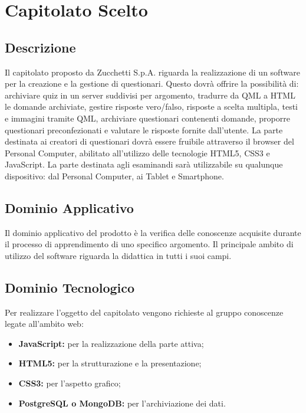 \section{Capitolato Scelto}
\subsection{Descrizione}
Il capitolato proposto da Zucchetti S.p.A. riguarda la realizzazione di un software per la creazione e la gestione di questionari. 
Questo dovrà offrire la possibilità di: archiviare quiz in un server suddivisi per argomento, tradurre da QML a HTML le domande archiviate, gestire risposte vero/falso, risposte a scelta multipla, testi e immagini tramite QML, archiviare questionari contenenti domande, proporre questionari preconfezionati e valutare le risposte fornite dall’utente.
La parte destinata ai creatori di questionari dovrà essere fruibile attraverso il browser del Personal Computer, abilitato all’utilizzo delle tecnologie HTML5, CSS3 e JavaScript.
La parte destinata agli esaminandi sarà utilizzabile su qualunque dispositivo: dal Personal Computer, ai Tablet e Smartphone.

\subsection{Dominio Applicativo}
Il dominio applicativo del prodotto è la verifica delle conoscenze acquisite durante il processo di apprendimento di uno specifico argomento.
Il principale ambito di utilizzo del software riguarda la didattica in tutti i suoi campi.

\subsection{Dominio Tecnologico}
Per realizzare l’oggetto del capitolato vengono richieste al gruppo conoscenze legate all’ambito web:
\begin{itemize}
\item \textbf{JavaScript:} per la realizzazione della parte attiva;
\item \textbf{HTML5:} per la strutturazione e la presentazione; 
\item \textbf{CSS3:} per l’aspetto grafico;
\item \textbf{PostgreSQL o MongoDB:} per l'archiviazione dei dati.
\end{itemize}

